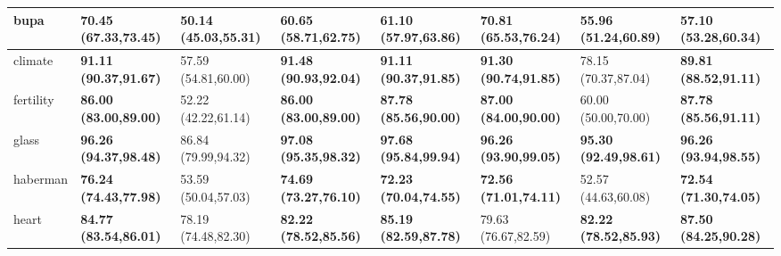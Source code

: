 \documentclass[conference]{IEEEtran}
\begin{document}
\begin{table*}[thpbh]
\begin{adjustbox}{width=1\textwidth}
\begin{tabular}{@{}cccccccc@{}}
			\multicolumn{1}{|l|}{bupa}        & \multicolumn{1}{l|}{\textbf{70.45 (67.33,73.45)}} & \multicolumn{1}{l|}{50.14 (45.03,55.31)} & \multicolumn{1}{l|}{60.65 (58.71,62.75)} & \multicolumn{1}{l|}{61.10 (57.97,63.86)}  & \multicolumn{1}{l|}{\textbf{70.81 (65.53,76.24)}}    & \multicolumn{1}{l|}{55.96 (51.24,60.89)}    & \multicolumn{1}{l|}{57.10 (53.28,60.34)}    \\ \midrule
			\multicolumn{1}{|l|}{climate}      & \multicolumn{1}{l|}{\textbf{91.11 (90.37,91.67)}} & \multicolumn{1}{l|}{57.59 (54.81,60.00)} & \multicolumn{1}{l|}{\textbf{91.48 (90.93,92.04)}} & \multicolumn{1}{l|}{\textbf{91.11 (90.37,91.85)}}  & \multicolumn{1}{l|}{\textbf{91.30 (90.74,91.85)}}    & \multicolumn{1}{l|}{78.15 (70.37,87.04)}    & \multicolumn{1}{l|}{\textbf{89.81 (88.52,91.11)}}    \\ \midrule
			\multicolumn{1}{|l|}{fertility}    & \multicolumn{1}{l|}{\textbf{86.00 (83.00,89.00)}} & \multicolumn{1}{l|}{52.22 (42.22,61.14)} & \multicolumn{1}{l|}{\textbf{86.00 (83.00,89.00)}} & \multicolumn{1}{l|}{\textbf{87.78 (85.56,90.00)}}  & \multicolumn{1}{l|}{\textbf{87.00 (84.00,90.00)}}    & \multicolumn{1}{l|}{60.00 (50.00,70.00)}    & \multicolumn{1}{l|}{\textbf{87.78 (85.56,91.11)}}    \\ \midrule
			\multicolumn{1}{|l|}{glass}        & \multicolumn{1}{l|}{\textbf{96.26 (94.37,98.48)}} & \multicolumn{1}{l|}{86.84 (79.99,94.32)} & \multicolumn{1}{l|}{\textbf{97.08 (95.35,98.32)}} & \multicolumn{1}{l|}{\textbf{97.68 (95.84,99.94)}}  & \multicolumn{1}{l|}{\textbf{96.26 (93.90,99.05)}}    & \multicolumn{1}{l|}{\textbf{95.30 (92.49,98.61)}}    & \multicolumn{1}{l|}{\textbf{96.26 (93.94,98.55)}}    \\ \midrule
			\multicolumn{1}{|l|}{haberman}     & \multicolumn{1}{l|}{\textbf{76.24 (74.43,77.98)}} & \multicolumn{1}{l|}{53.59 (50.04,57.03)} & \multicolumn{1}{l|}{\textbf{74.69 (73.27,76.10)}} & \multicolumn{1}{l|}{\textbf{72.23 (70.04,74.55)}}  & \multicolumn{1}{l|}{\textbf{72.56 (71.01,74.11)}}    & \multicolumn{1}{l|}{52.57 (44.63,60.08)}    & \multicolumn{1}{l|}{\textbf{72.54 (71.30,74.05)}}    \\ \midrule
			\multicolumn{1}{|l|}{heart}        & \multicolumn{1}{l|}{\textbf{84.77 (83.54,86.01)}} & \multicolumn{1}{l|}{78.19 (74.48,82.30)} & \multicolumn{1}{l|}{\textbf{82.22 (78.52,85.56)}} & \multicolumn{1}{l|}{\textbf{85.19 (82.59,87.78)}}  & \multicolumn{1}{l|}{79.63 (76.67,82.59)}    & \multicolumn{1}{l|}{\textbf{82.22 (78.52,85.93)}}    & \multicolumn{1}{l|}{\textbf{87.50 (84.25,90.28)}}    \\ \midrule

\end{tabular}
\end{adjustbox}
\end{table*}
\end{document}
